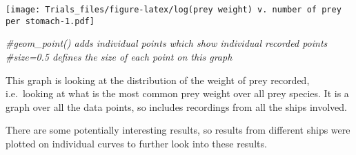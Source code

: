 \documentclass[
]{article}
\newenvironment{Shaded}{\begin{snugshade}}{\end{snugshade}}
\newcommand{\CommentTok}[1]{\textcolor[rgb]{0.56,0.35,0.01}{\textit{#1}}}
\begin{document}
\texttt{[image: Trials\_files/figure-latex/log(prey weight) v. number of prey per stomach-1.pdf]}

\begin{Shaded}
\begin{Highlighting}[]
\CommentTok{\#geom\_point() adds individual points which show individual recorded points}
\CommentTok{\#size=0.5 defines the size of each point on this graph}
\end{Highlighting}
\end{Shaded}

This graph is looking at the distribution of the weight of prey
recorded, i.e.~looking at what is the most common prey weight over all
prey species. It is a graph over all the data points, so includes
recordings from all the ships involved.

There are some potentially interesting results, so results from
different ships were plotted on individual curves to further look into
these results.
\end{document}
